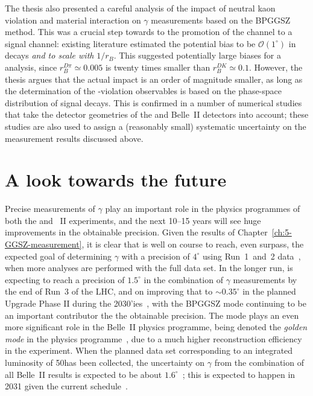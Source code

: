 The thesis also presented a careful analysis of the impact of neutral kaon \CP violation and material interaction on $\gamma$ measurements based on the BPGGSZ method. This was a crucial step towards to the promotion of the \BtoDpi channel to a signal channel: existing literature estimated the potential bias to be $\mathcal O(1^\circ)$ in \BtoDK decays \emph{and to scale with} $1/r_B$. This suggested potentially large biases for a \BtoDpi analysis, since $r_B^{D\pi}\simeq0.005$ is twenty times smaller than $r_B^{DK}\simeq 0.1$. However, the thesis argues that the actual impact is an order of magnitude smaller, as long as the determination of the \CP-violation observables is based on the phase-space distribution of signal decays. This is confirmed in a number of numerical studies that take the detector geometries of the \lhcb and Belle~II detectors into account; these studies are also used to assign a (reasonably small) systematic uncertainty on the measurement results discussed above.

\section{A look towards the future} %
\label{sec:a_look_towards_the_future}


Precise measurements of $\gamma$ play an important role in the physics programmes of both the \lhcb and \belle~II experiments, and the next 10--15 years will see huge improvements in the obtainable precision. Given the results of Chapter~\ref{ch:5-GGSZ-measurement}, it is clear that \lhcb is well on course to reach, even surpass, the expected goal of determining $\gamma$ with a precision of $4^\circ$ using Run~1~and~2 data~\cite{LHCbUpgradeITDR}, when more analyses are performed with the full data set. In the longer run, \lhcb is expecting to reach a precision of $1.5^\circ$ in the combination of $\gamma$ measurements by the end of Run~3 of the LHC, and on improving that to $\sim 0.35^\circ$ in the planned Upgrade Phase II during the 2030'ies~\cite{lhcbcollaborationPhysicsCaseLHCb2019}, with the BPGGSZ mode continuing to be an important contributor the the obtainable precision. The mode plays an even more significant role in the Belle~II physics programme, being denoted the \emph{golden mode} in the physics programme~\cite{kouBelleIIPhysics2019}, due to a much higher \KS reconstruction efficiency in the experiment. When the planned data set corresponding to an integrated luminosity of 50\invab has been collected, the uncertainty on $\gamma$ from the combination of all Belle~II results is expected to be about $1.6^\circ$~\cite{kouBelleIIPhysics2019}; this is expected to happen in 2031 given the current schedule~\cite{BelleTimescale}.

